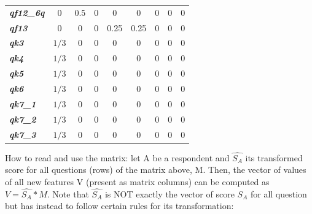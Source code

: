\documentclass[a4paper,11pt]{article}
\begin{document}
\begin{table}[H]
\begin{center}
{\begin{tabular}{|l|c|c|c|c|c|c|c|c|}
    \textit{\textbf{qf12\_6q}} & 0 & 0.5 & 0 & 0 & 0 & 0 & 0 & 0 \\
    \textit{\textbf{qf13}} & 0 & 0 & 0 & 0.25 & 0.25 & 0 & 0 & 0 \\
    \textit{\textbf{qk3}} & $1/3$ & 0 & 0 & 0 & 0 & 0 & 0 & 0 \\
    \textit{\textbf{qk4}} & $1/3$ & 0 & 0 & 0 & 0 & 0 & 0 & 0 \\
    \textit{\textbf{qk5}} & $1/3$ & 0 & 0 & 0 & 0 & 0 & 0 & 0 \\
    \textit{\textbf{qk6}} & $1/3$ & 0 & 0 & 0 & 0 & 0 & 0 & 0 \\
    \textit{\textbf{qk7\_1}} & $1/3$ & 0 & 0 & 0 & 0 & 0 & 0 & 0 \\
    \textit{\textbf{qk7\_2}} & $1/3$ & 0 & 0 & 0 & 0 & 0 & 0 & 0 \\
    \textit{\textbf{qk7\_3}} & $1/3$ & 0 & 0 & 0 & 0 & 0 & 0 & 0 \\
    \hline
    \end{tabular}}
    
  \end{center}

\end{table}
How to read and use the matrix: let A be a respondent and $\hat{S_A}$ its transformed score for all questions (rows) of the matrix above, M. 
Then, the vector of values of all new features V (present as matrix columns) can be computed as $V=\hat{S_A} * M$. Note that $\hat{S_A}$ is NOT exactly the vector of score $S_A$ for all question but has instead to follow certain rules for its transformation: 
\end{document}
